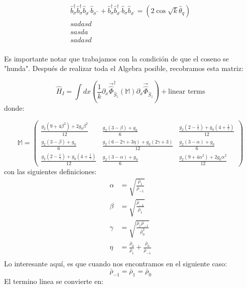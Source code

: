 \begin{align}
    \hat{b}_{\sigma}^{\dagger}\hat{b}_{\sigma}^{\dagger} \hat{b}_{\sigma^\prime}^{} \hat{b}_{\sigma^{\prime \prime}}^{} + \hat{b}_{\sigma}^{\dagger}\hat{b}_{\sigma^\prime}^{\dagger} \hat{b}_{\sigma}^{} \hat{b}_{\sigma^\prime}^{} = \left( 2\cos{\sqrt{k}\hat{\theta}_{q}} \right) \\
    sadasd\\
    sasda\\
    sadasd \\ 
\end{align}

Es importante notar que trabajamos con la condición de que el coseno se "hunda".
Después de realizar toda el Algebra posible, recobramos esta matriz:

\begin{equation}
    \hat{H}_{I} = \int dx \left( \frac{1}{k} \partial_{x} \vec{\hat{\Phi}}_{\hat{S}_{z}}^{\dagger}  (\mathbb{M}) \partial_{x} \vec{\hat{\Phi}}_{\hat{S}_{z}} \right) + \text{linear terms}
\end{equation}
donde:

\begin{equation}
    \mathbb{M} = \begin{pmatrix}
        \frac{g_2(9+4\beta^2) +2g_0\beta^2 }{12} & \frac{g_2(3-\beta) + g_0}{6} & \frac{g_2(2-\frac{1}{\gamma}) + g_0 (4 + \frac{1}{\gamma})}{12}  \\
        \frac{g_2(3-\beta) + g_0}{6} & \frac{g_2(6-2\gamma +3\eta) + g_0(2\gamma +3)}{12} & \frac{g_2(3-\alpha) + g_0}{6} \\
        \frac{g_2(2-\frac{1}{\gamma}) + g_0 (4 + \frac{1}{\gamma})}{12} & \frac{g_2(3-\alpha) + g_0}{6} &   \frac{g_2(9+4\alpha^2) +2g_0\alpha^2 }{12}
            \end{pmatrix}
\end{equation}
con las siguientes definiciones:
\begin{align*}
    \alpha &= \sqrt{\frac{\bar{\rho}_1}{\bar{\rho}_{-1}}} \\
    \beta &=  \sqrt{\frac{\bar{\rho}_{-1}}{\bar{\rho}_1}} \\
    \gamma &= \sqrt{\frac{\bar{\rho}_1 \bar{\rho}_{-1}}{\bar{\rho}_0^2}} \\
    \eta &= \frac{\bar{\rho}_0}{\bar{\rho}_1} + \frac{\bar{\rho}_0}{\bar{\rho}_{-1}} \\
\end{align*}
Lo interesante aquí, es que cuando nos encontramos en el siguiente caso:
\begin{equation}
    \bar{\rho}_{-1} = \bar{\rho}_{1} = \bar{\rho}_{0}
\end{equation}
El termino linea se convierte en:

